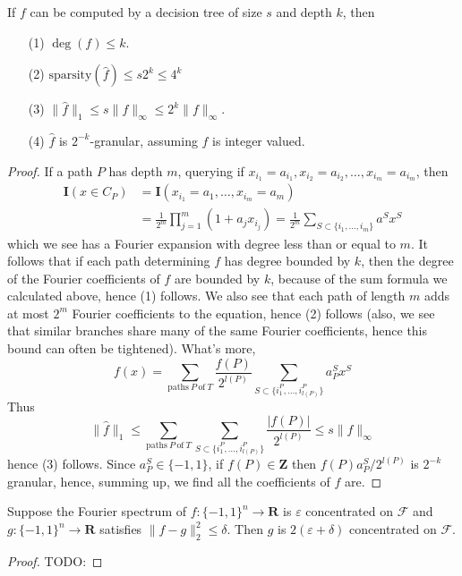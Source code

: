 \begin{theorem}
    If $f$ can be computed by a decision tree of size $s$ and depth $k$, then
    \begin{enumerate}
        \item[(1)] $\deg(f) \leq k$.
        \item[(2)] $\text{sparsity}(\widehat{f}) \leq s2^k \leq 4^k$
        \item[(3)] $\| \widehat{f} \|_1 \leq s \| f \|_\infty \leq 2^k \| f \|_\infty$.
        \item[(4)] $\widehat{f}$ is $2^{-k}$-granular, assuming $f$ is integer valued.
    \end{enumerate}
\end{theorem}
\begin{proof}
    If a path $P$ has depth $m$, querying if $x_{i_1} = a_{i_1}, x_{i_2} = a_{i_2}, \dots, x_{i_m} = a_{i_m}$, then
    \begin{align*}
        \mathbf{I}(x \in C_P) &= \mathbf{I}(x_{i_1} = a_1, \dots, x_{i_m} = a_m)\\
        &= \frac{1}{2^m} \prod_{j = 1}^m \left( 1 + a_j x_{i_j} \right) = \frac{1}{2^m} \sum_{S \subset \{ i_1, \dots, i_m \}} a^Sx^S
    \end{align*}
    which we see has a Fourier expansion with degree less than or equal to $m$. It follows that if each path determining $f$ has degree bounded by $k$, then the degree of the Fourier coefficients of $f$ are bounded by $k$, because of the sum formula we calculated above, hence (1) follows. We also see that each path of length $m$ adds at most $2^m$ Fourier coefficients to the equation, hence (2) follows (also, we see that similar branches share many of the same Fourier coefficients, hence this bound can often be tightened). What's more,
    \[ f(x) = \sum_{\text{paths}\ P\ \text{of}\ T} \frac{f(P)}{2^{l(P)}} \sum_{S \subset \{ i^P_1, \dots, i^P_{l(P)} \} } a_P^Sx^S \]
    Thus
    \[ \| \widehat{f} \|_1 \leq \sum_{\text{paths}\ P\ \text{of}\ T} \sum_{S \subset \{ i^P_1, \dots, i^P_{l(P)} \}} \frac{|f(P)|}{2^{l(P)}} \leq s \| f \|_\infty \]
    hence (3) follows. Since $a_P^S \in \{ -1, 1 \}$, if $f(P) \in \mathbf{Z}$ then $f(P) a_P^S / 2^{l(P)}$ is $2^{-k}$ granular, hence, summing up, we find all the coefficients of $f$ are.
\end{proof}

\begin{lemma}
    Suppose the Fourier spectrum of $f: \{ -1, 1 \}^n \to \mathbf{R}$ is $\varepsilon$ concentrated on $\mathcal{F}$ and $g: \{ -1, 1 \}^n \to \mathbf{R}$ satisfies $\| f - g \|_2^2 \leq \delta$. Then $g$ is $2(\varepsilon + \delta)$ concentrated on $\mathcal{F}$.
\end{lemma}
\begin{proof}
    TODO: 
\end{proof}

